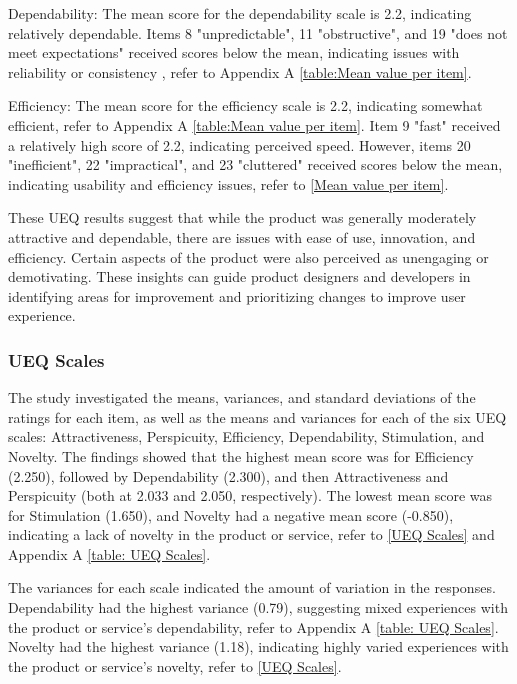 \documentclass[conference,onecolumn]{IEEEtran}
\begin{document}
            Dependability: The mean score for the dependability scale is 2.2, indicating relatively dependable. Items 8 "unpredictable", 11 "obstructive", and 19 "does not meet expectations" received scores below the mean, indicating issues with reliability or consistency , refer to Appendix A \tablename{ \ref{table:Mean value per item}}.

            Efficiency: The mean score for the efficiency scale is 2.2, indicating somewhat efficient, refer to Appendix A \tablename{ \ref{table:Mean value per item}}. Item 9 "fast" received a relatively high score of 2.2, indicating perceived speed. However, items 20 "inefficient", 22 "impractical", and 23 "cluttered" received scores below the mean, indicating usability and efficiency issues, refer to \figurename{\ref{Mean value per item}}.

            These UEQ results suggest that while the product was generally moderately attractive and dependable, there are issues with ease of use, innovation, and efficiency. Certain aspects of the product were also perceived as unengaging or demotivating. These insights can guide product designers and developers in identifying areas for improvement and prioritizing changes to improve user experience.
        
        
        \subsubsection{UEQ Scales}\hfill

            The study investigated the means, variances, and standard deviations of the ratings for each item, as well as the means and variances for each of the six UEQ scales: Attractiveness, Perspicuity, Efficiency, Dependability, Stimulation, and Novelty. The findings showed that the highest mean score was for Efficiency (2.250), followed by Dependability (2.300), and then Attractiveness and Perspicuity (both at 2.033 and 2.050, respectively). The lowest mean score was for Stimulation (1.650), and Novelty had a negative mean score (-0.850), indicating a lack of novelty in the product or service, refer to \figurename{\ref{UEQ Scales}} and Appendix A \tablename{ \ref{table: UEQ Scales}}.

            The variances for each scale indicated the amount of variation in the responses. Dependability had the highest variance (0.79), suggesting mixed experiences with the product or service's dependability, refer to Appendix A \tablename{ \ref{table: UEQ Scales}}. Novelty had the highest variance (1.18), indicating highly varied experiences with the product or service's novelty, refer to \figurename{\ref{UEQ Scales}}.
\end{document}
